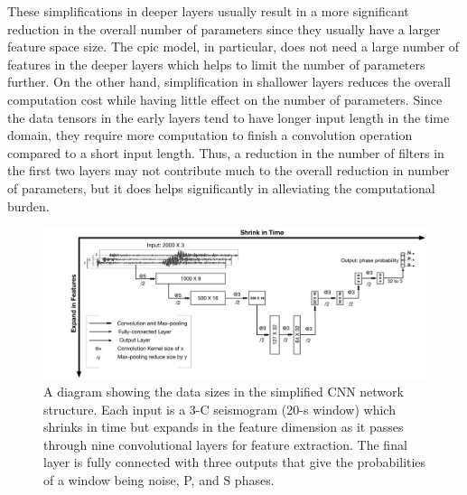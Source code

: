 \documentclass{article}
\begin{document}
These simplifications in deeper layers usually result in a more significant reduction in the overall number of parameters since they usually have a larger feature space size.
The \gls{cpic} model, in particular, does not need a large number of features in the deeper layers which helps to limit the number of parameters further.
On the other hand, simplification in shallower layers reduces the overall computation cost while having little effect on the number of parameters.
Since the data tensors in the early layers tend to have longer input length in the time domain, they require more computation to finish a convolution operation compared to a short input length.
Thus, a reduction in the number of filters in the first two layers may not contribute much to the overall reduction in number of parameters, but it does helps significantly in alleviating the computational burden.
%
\begin{figure}
    \centering
    \includegraphics[width=\linewidth]{cpicv2_diagram}
    \caption{A diagram showing the data sizes in the simplified CNN network structure. Each input is a 3-C seismogram (20-s window) which shrinks in time but expands in the feature dimension as it passes through nine convolutional layers for feature extraction. The final layer is fully connected with three outputs that give the probabilities of a window being noise, P, and S phases.}
    \label{fig:cpicv2}
\end{figure}
%
\end{document}
